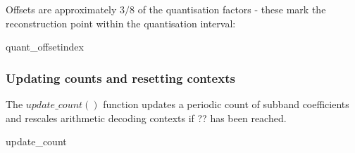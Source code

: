 Offsets are approximately $3/8$ of the quantisation factors - these
mark the reconstruction point within the quantisation interval:

\begin{pseudo}{quant\_offset}{index}
\end{pseudo}

\subsubsection{Updating counts and resetting contexts}
\label{updatecounts}

The $update\_count()$ function updates a periodic count of subband 
coefficients and rescales arithmetic decoding contexts if ?? has been reached.

\begin{pseudo}{update\_count}{}
\bsIF{\CoefficientCount == \CoefficientReset}
  \bsEND
\bsEND
\end{pseudo}
